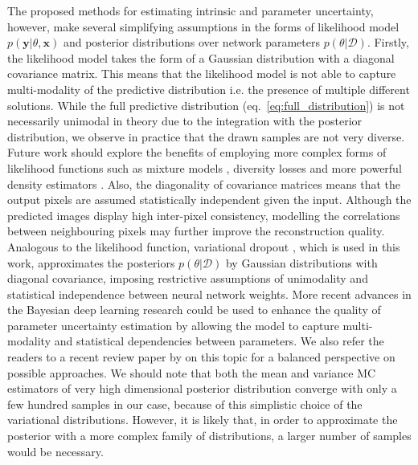  The proposed methods for estimating intrinsic and parameter uncertainty, however, make several simplifying assumptions in the forms of likelihood model $p(\mathbf{y}|\theta, \mathbf{x})$ and posterior distributions over network parameters $p(\theta|\mathcal{D})$. Firstly, the likelihood model takes the form of a Gaussian distribution with a diagonal covariance matrix. This means that the likelihood model is not able to capture multi-modality of the predictive distribution i.e. the presence of multiple different solutions. While the full predictive distribution (eq.~\eqref{eq:full_distribution}) is not necessarily unimodal in theory due to the integration with the posterior distribution, we observe in practice that the drawn samples are not very diverse. Future work should explore the benefits of employing more complex forms of likelihood functions such as mixture models \cite{bishop1994mixture,kohl2018probabilistic}, diversity losses \cite{guzman2012multiple,bouchacourt2016disco,lee2018diverse} and more powerful density estimators \cite{huang2018multimodal,rezende2015variational,papamakarios2017masked,odena2017conditional,kohl2018probabilistic}. Also, the diagonality of covariance matrices means that the output pixels are assumed statistically independent given the input. Although the predicted images display high inter-pixel consistency, modelling the correlations between neighbouring pixels \cite{chandra2016fast} may further improve the reconstruction quality. Analogous to the likelihood function, variational dropout \cite{kingma2015variational}, which is used in this work, approximates the posteriors $p(\theta|\mathcal{D})$ by Gaussian distributions with diagonal covariance, imposing restrictive assumptions of unimodality and statistical independence between neural network weights. More recent advances in the Bayesian deep learning research \cite{louizos2016structured,oh2019radial,krueger2017bayesian,zhang2019cyclical,pawlowski2017implicit,louizos2017multiplicative} could be used to enhance the quality of parameter uncertainty estimation by allowing the model to capture multi-modality and statistical dependencies between parameters.  We also refer the readers to a recent review paper by \cite{zhang2018advances} on this topic for a balanced perspective on possible approaches. We should note that both the mean and variance MC estimators of very high dimensional posterior distribution converge with only a few hundred samples in our case, because of this simplistic choice of the variational distributions. However, it is likely that, in order to approximate the posterior with a more complex family of distributions, a larger number of samples would be necessary. 

